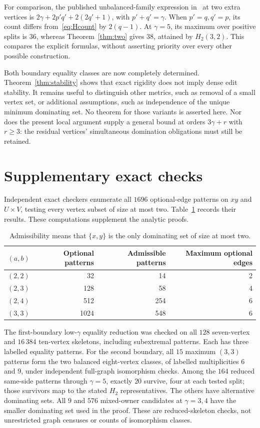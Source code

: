\documentclass[11pt]{article}
\theoremstyle{definition}
\theoremstyle{remark}
\begin{document}
For comparison, the published unbalanced-family expression in~\cite{E}
at two extra vertices is $2\gamma+2p'q'+2(2q'+1)$, with $p'+q'=\gamma$.
When $p'=q,q'=p$, its count differs from~\eqref{eq:Hcount} by $2(q-1)$.
At $\gamma=5$, its maximum over positive splits is $36$, whereas
Theorem~\ref{thm:two} gives $38$, attained by $H_2(3,2)$. This compares
the explicit formulas, without asserting priority over every other
possible construction.

Both boundary equality classes are now completely determined. Theorem~\ref{thm:stability}
shows that exact rigidity does not imply dense edit stability. It remains
useful to distinguish other metrics, such as removal of a small vertex set,
or additional assumptions, such as independence of the unique minimum
dominating set. No theorem for those variants is asserted here. Nor does
the present local argument supply a general bound at orders $3\gamma+r$
with $r\ge3$: the residual vertices' simultaneous domination obligations
must still be retained.

\appendix
\section{Supplementary exact checks}\label{app:checks}

Independent exact checkers enumerate all $1696$ optional-edge patterns
on $xy$ and $U\times V$, testing every vertex subset of size at most two.
Table~\ref{tab:cells} records their results. These computations supplement
the analytic proofs.

\begin{table}[htbp]
\centering
\begin{tabular}{rrrr}
\toprule
$(a,b)$ & Optional patterns & Admissible patterns & Maximum optional edges\\
\midrule
$(2,2)$ & 32 & 14 & 2\\
$(2,3)$ & 128 & 58 & 4\\
$(2,4)$ & 512 & 254 & 6\\
$(3,3)$ & 1024 & 548 & 6\\
\bottomrule
\end{tabular}
\caption{Admissibility means that $\{x,y\}$ is the only dominating set of size at most two.}
\label{tab:cells}
\end{table}

The first-boundary low-$\gamma$ equality reduction was checked on all
$128$ seven-vertex and $16\,384$ ten-vertex skeletons, including
subextremal patterns. Each has three labelled equality patterns.
For the second boundary, all $15$ maximum $(3,3)$ patterns form the
two balanced eight-vertex classes, of labelled multiplicities $6$ and
$9$, under independent full-graph isomorphism checks. Among the $164$
reduced same-side patterns through $\gamma=5$, exactly $20$ survive,
four at each tested split; those survivors map to the stated $H_2$
representatives. The others have alternative dominating sets.
All $9$ and $576$ mixed-owner candidates at $\gamma=3,4$ have the
smaller dominating set used in the proof. These are reduced-skeleton
checks, not unrestricted graph censuses or counts of isomorphism classes.
\end{document}
